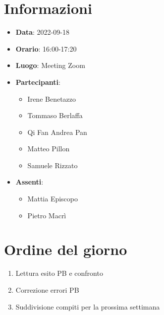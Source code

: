 \section{Informazioni}
	\begin{itemize}
		\item \textbf{Data}: 2022-09-18     %
		\item \textbf{Orario}: 16:00-17:20  %
		\item \textbf{Luogo}: Meeting Zoom
		\item \textbf{Partecipanti}:
		\begin{itemize}
			\item Irene Benetazzo
			\item Tommaso Berlaffa
			\item Qi Fan Andrea Pan
			\item Matteo Pillon
			\item Samuele Rizzato
		\end{itemize}
    \item \textbf{Assenti}: 
		\begin{itemize}
		\item Mattia Episcopo 
		\item Pietro Macrì
		\end{itemize}   
	\end{itemize}
    
	\section{Ordine del giorno}
	\begin{enumerate}
		\item Lettura esito PB e confronto
		\item Correzione errori PB
		\item Suddivisione compiti per la prossima settimana
	\end{enumerate}
\newpage